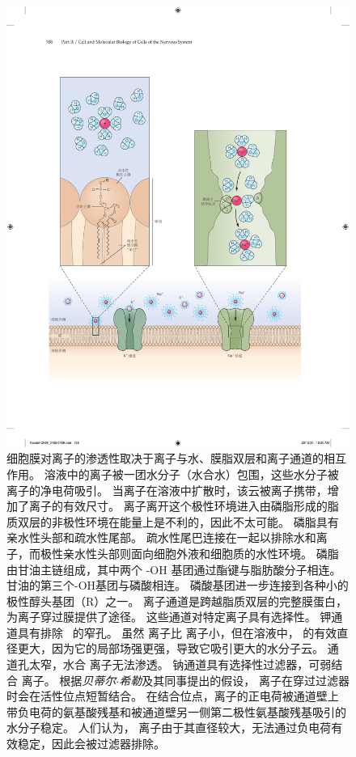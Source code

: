 \begin{figure}[htbp]
	\centering
	\includegraphics[width=0.9\linewidth]{chap08/fig_8_1}
	\caption{细胞膜对离子的渗透性取决于离子与水、膜脂双层和离子通道的相互作用。
		溶液中的离子被一团水分子（水合水）包围，这些水分子被离子的净电荷吸引。
		当离子在溶液中扩散时，该云被离子携带，增加了离子的有效尺寸。
		离子离开这个极性环境进入由磷脂形成的脂质双层的非极性环境在能量上是不利的，因此不太可能。
		磷脂具有亲水性头部和疏水性尾部。
		疏水性尾巴连接在一起以排除水和离子，而极性亲水性头部则面向细胞外液和细胞质的水性环境。
		磷脂由甘油主链组成，其中两个 -OH 基团通过酯键与脂肪酸分子相连。
		甘油的第三个-OH基团与磷酸相连。
		磷酸基团进一步连接到各种小的极性醇头基团（R）之一。
		离子通道是跨越脂质双层的完整膜蛋白，为离子穿过膜提供了途径。
		这些通道对特定离子具有选择性。
		钾通道具有排除~ 的窄孔。
		虽然  离子比  离子小，但在溶液中， 的有效直径更大，因为它的局部场强更强，导致它吸引更大的水分子云。
		 通道孔太窄，水合  离子无法渗透。
		钠通道具有选择性过滤器，可弱结合  离子。
		根据\textit{贝蒂尔$\cdot$希勒}及其同事提出的假设， 离子在穿过过滤器时会在活性位点短暂结合。
		在结合位点，离子的正电荷被通道壁上带负电荷的氨基酸残基和被通道壁另一侧第二极性氨基酸残基吸引的水分子稳定。
		人们认为， 离子由于其直径较大，无法通过负电荷有效稳定，因此会被过滤器排除。}
	\label{fig:8_1}
\end{figure}


